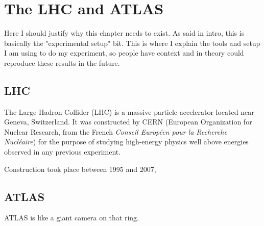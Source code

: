 \chapter{The LHC and ATLAS}\label{chapter:experiment}

Here I should justify why this chapter needs to exist. As said in intro, this is basically the "experimental setup" bit. This is where I explain the tools and setup I am using to do my experiment, so people have context and in theory could reproduce these results in the future.


\section{LHC}

The Large Hadron Collider (LHC) is a massive particle accelerator located near Geneva, Switzerland.
It was constructed by CERN (European Organization for Nuclear Research, from the French \textit{Conseil Européen pour la Recherche Nucléaire}) for the purpose of studying high-energy physics well above energies observed in any previous experiment.

Construction took place between 1995 and 2007, 






\section{ATLAS}

ATLAS is like a giant camera on that ring.

